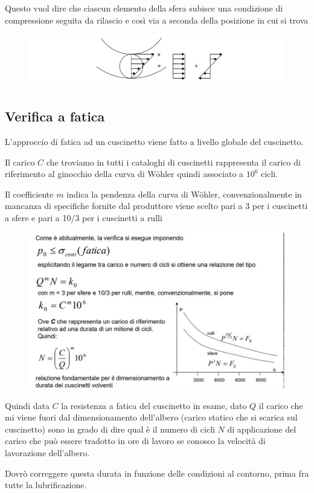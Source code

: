 \documentclass[a4paper, 15pt]{article}
\begin{document}
			Questo vuol dire che ciascun elemento della sfera subisce una condizione di compressione seguita da rilascio e così via a seconda della posizione in cui si trova
			
			\begin{figure}[H]
				\centering
				\includegraphics[width=0.5\linewidth]{immagini/screenshot019}
				\label{fig:screenshot019}
			\end{figure}
			
			\subsection{Verifica a fatica}
			L’approccio di fatica ad un cuscinetto viene fatto a livello globale del cuscinetto. \newline
			
			Il carico $C$ che troviamo in tutti i cataloghi di cuscinetti rappresenta il carico di riferimento al ginocchio della curva di Wöhler quindi associato a $10^6$ cicli. 
			
			Il coefficiente $m$ indica la pendenza della curva di Wöhler, convenzionalmente in mancanza di specifiche fornite dal produttore viene scelto pari a 3 per i cuscinetti a sfere e pari a 10/3 per i cuscinetti a rulli
			\begin{figure}[H]
				\centering
				\includegraphics[width=0.5\linewidth]{immagini/screenshot020}
				\label{fig:screenshot020}
			\end{figure}
			Quindi data $C$ la resistenza a fatica del cuscinetto in esame, dato $Q$ il carico che mi viene fuori dal dimensionamento dell’albero (carico statico che si scarica sul cuscinetto) sono in grado di dire qual è il numero di cicli $N$ di applicazione del carico che può essere tradotto in ore di lavoro se conosco la velocità di lavorazione dell’albero. \newline
			
			Dovrò correggere questa durata in funzione delle condizioni al contorno, prima fra tutte la lubrificazione. 
			
\end{document}
